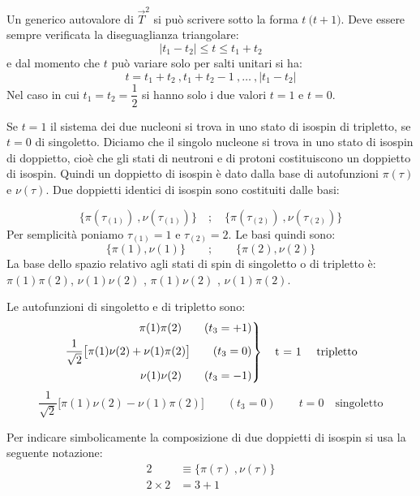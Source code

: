 Un generico autovalore di $\vec{T}^2$ si può scrivere sotto la forma $ t \ \bigl
( t + 1 \bigr ) $. Deve essere sempre verificata la diseguaglianza triangolare:
\begin{equation*}
| t_{1} - t_{2} | \le t \le t_1 + t_2
\end{equation*}
e dal momento che $t$ può variare solo per salti unitari si ha:
\begin{equation*}
t = t_1+ t_2 \ , t_1 + t_2 -1 \ , \dots \ , | t_1 - t_2 |
\end{equation*}
Nel caso in cui $t_1 = t_2 = \dfrac{1}{2}$ si hanno solo i due valori $ t = 1 $
e $ t = 0 $.

Se $t = 1$ il sistema dei due nucleoni si trova in uno stato di isospin di
tripletto, se $ t = 0$ di singoletto. Diciamo che il singolo nucleone si trova
in uno stato di isospin di doppietto, cioè che gli stati di neutroni e di
protoni costituiscono un doppietto di isospin. Quindi un doppietto di isospin è
dato dalla base di autofunzioni $\pi(\tau)$ e $\nu(\tau)$. Due doppietti
identici di isospin sono costituiti dalle basi:

\begin{equation*}
\bigl\{ \pi (\tau_{(1)}) \ , \nu(\tau_{(1)}) \bigr\} \quad ;	\quad \bigl\{\pi(\tau_{(2)}) \ , \nu(\tau_{(2)}) \bigr\} 
\end{equation*}
Per semplicità poniamo $\tau_{(1)} = 1$ e $\tau_{(2)} = 2$. Le basi quindi sono:
\begin{equation*}
\bigl\{ \pi (1), \nu(1) \bigr\} \qquad; \qquad \bigl\{ \pi(2), \nu(2) \bigr\}
\end{equation*}
La base dello spazio relativo agli stati di spin di singoletto o di tripletto è: 
$\pi(1) \pi(2)$, $\nu(1) \nu (2)$ , $\pi(1) \nu (2)$ , $\nu (1) \pi (2)$.

Le autofunzioni di singoletto e di tripletto sono:
\[
\left.
\begin{aligned}
\pi (1) \pi (2) 	\qquad (t_3 = + 1) \\
\dfrac{1}{\sqrt{2}} \bigl [\pi(1) \nu(2) + \nu (1) \pi(2) \bigr] 	\qquad (t_3 = 0) \\
\nu (1) \nu (2) 	\qquad (t_3= -1) 
\end{aligned}
\right\}
\quad
\text{t = 1 \quad tripletto}
\]
\begin{equation*}
\dfrac{1}{\sqrt{2}} \bigl [\pi(1) \nu(2) - \nu (1) \pi(2) \bigr] 	\qquad (t_3 = 0) 	\qquad t = 0 \quad  \text{singoletto}
\end{equation*} 

Per indicare simbolicamente la composizione di due doppietti di isospin si usa
la seguente notazione:
\begin{align*}
2 &\equiv	\bigl\{ \pi(\tau) \ , \nu(\tau) \bigr\} \\
2 \times 2 &= 3 + 1
\end{align*}


